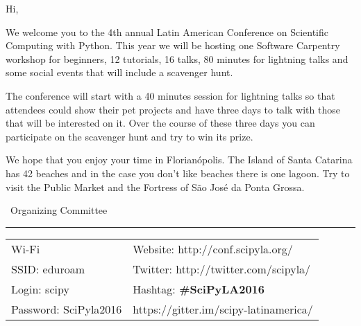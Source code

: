 Hi,

\vskip1cm

We welcome you to the 4th annual Latin American Conference on Scientific Computing with Python.
This year we will be hosting one Software Carpentry workshop for beginners,
12 tutorials, 16 talks, 80 minutes for lightning talks
and some social events that will include a scavenger hunt.

The conference will start with a 40 minutes session for lightning talks
so that attendees could show their pet projects and have three days to talk with
those that will be interested on it.
Over the course of these three days you can participate on the scavenger hunt
and try to win its prize.

We hope that you enjoy your time in Florianópolis.
The Island of Santa Catarina has 42 beaches
and in the case you don't like beaches there is one lagoon.
Try to visit the Public Market
and the Fortress of São José da Ponta Grossa.

\vskip1cm

\textemdash\ Organizing Committee

\vfill

\hrule

\begin{center}
       \begin{tabular}{p{4cm} p{7cm}}
     Wi-Fi & Website: http://conf.scipyla.org/ \\
     SSID: eduroam & Twitter: http://twitter.com/scipyla/ \\
     Login: scipy & Hashtag: \textbf{\#SciPyLA2016} \\
     Password: SciPyla2016 & https://gitter.im/scipy-latinamerica/
   \end{tabular}
\end{center}


